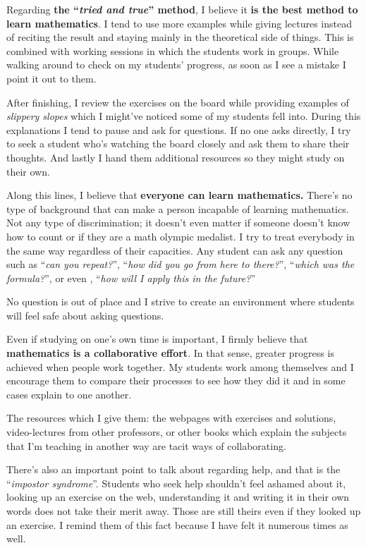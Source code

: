 \documentclass[a4paper,12pt,final]{book}
\begin{document}
Regarding \textbf{the ``\emph{tried and true}'' method}, I believe it \textbf{is the best method to learn mathematics}. I tend to use more examples while giving lectures instead of reciting the result and staying mainly in the theoretical side of things. This is combined with working sessions in which the students work in groups. While walking around to check on my students' progress, as soon as I see a mistake I point it out to them.\par 
After finishing, I review the exercises on the board while providing examples of \emph{slippery slopes} which I might've noticed some of my students fell into. During this explanations I tend to pause and ask for questions. If no one asks directly, I try to seek a student who's watching the board closely and ask them to share their thoughts. And lastly I hand them additional resources so they might study on their own.\par 
Along this lines, I believe that \textbf{everyone can learn mathematics.} There's no type of background that can make a person incapable of learning mathematics. Not any type of discrimination; it doesn't even matter if someone doesn't know how to count or if they are a math olympic medalist. I try to treat everybody in the same way regardless of their capacities. Any student can ask any question such as ``\emph{can you repeat?}'', ``\emph{how did you go from here to there?}'', ``\emph{which was the formula?}'', or even , ``\emph{how will I apply this in the future?}''\par 
No question is out of place and I strive to create an environment where students will feel safe about asking questions.\par 
Even if studying on one's own time is important, I firmly believe that \textbf{mathematics is a collaborative effort}. In that sense, greater progress is achieved when people work together. My students work among themselves and I encourage them to compare their processes to see how they did it and in some cases explain to one another.\par 
The resources which I give them: the webpages with exercises and solutions, video-lectures from other professors, or other books which explain the subjects that I'm teaching in another way are tacit ways of collaborating.\par 
There's also an important point to talk about regarding help, and that is the ``\emph{impostor syndrome}''. Students who seek help shouldn't feel ashamed about it, looking up an exercise on the web, understanding it and writing it in their own words does not take their merit away. Those are still theirs even if they looked up an exercise. I remind them of this fact because I have felt it numerous times as well.\par 
\end{document}
